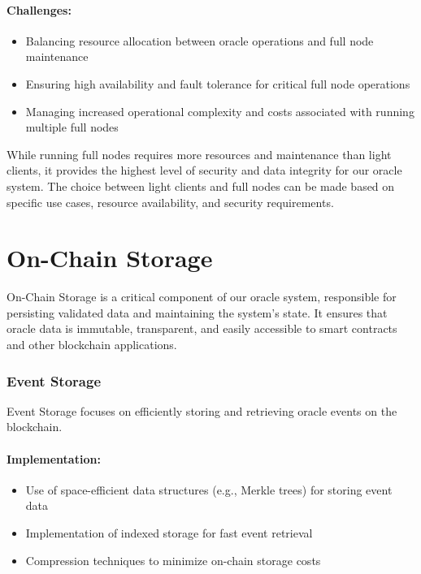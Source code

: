 \documentclass[12pt,a4paper]{article}
\begin{document}
	\paragraph{Challenges:}
	\begin{itemize}
		\item Balancing resource allocation between oracle operations and full node maintenance
		\item Ensuring high availability and fault tolerance for critical full node operations
		\item Managing increased operational complexity and costs associated with running multiple full nodes
	\end{itemize}
	
	While running full nodes requires more resources and maintenance than light clients, it provides the highest level of security and data integrity for our oracle system. The choice between light clients and full nodes can be made based on specific use cases, resource availability, and security requirements.
	
	\section{On-Chain Storage}
	On-Chain Storage is a critical component of our oracle system, responsible for persisting validated data and maintaining the system's state. It ensures that oracle data is immutable, transparent, and easily accessible to smart contracts and other blockchain applications.
	
	\subsubsection{Event Storage}
	Event Storage focuses on efficiently storing and retrieving oracle events on the blockchain.
	
	\paragraph{Implementation:}
	\begin{itemize}
		\item Use of space-efficient data structures (e.g., Merkle trees) for storing event data
		\item Implementation of indexed storage for fast event retrieval
		\item Compression techniques to minimize on-chain storage costs
	\end{itemize}
	
\end{document}
